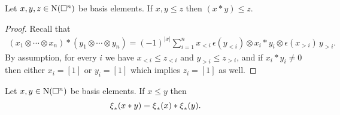 \begin{lemma}
	Let $x, y, z \in \operatorname{N}(\square^n)$ be basis elements.
	If $x, y \leq z$ then $(x \ast y) \leq z$.
\end{lemma}

\begin{proof}
	Recall that
	\begin{align*}
	(x_1 \otimes \cdots \otimes x_n) \ast (y_1 \otimes \cdots \otimes y_n) =
	(-1)^{|x|} \sum_{i=1}^n x_{<i}\, \epsilon(y_{<i}) \otimes x_i \ast y_i \otimes \epsilon(x_{>i}) \, y_{>i}.
	\end{align*}
	By assumption, for every $i$ we have $x_{<i} \leq z_{<i}$ and $y_{>i} \leq z_{>i}$, and if $x_i \ast y_i \neq 0$ then either $x_i = [1]$ or $y_i = [1]$ which implies $z_i = [1]$ as well.
\end{proof}

\begin{lemma}
	Let $x, y \in \operatorname{N}(\square^n)$ be basis elements.
	If $x \leq y$ then
	\begin{equation} \label{e:cs collapse as algebra map}
	\operatorname{\xi}_\ast(x \ast y) = \operatorname{\xi}_\ast(x) \ast \operatorname{\xi}_\ast(y).
	\end{equation}
\end{lemma}

